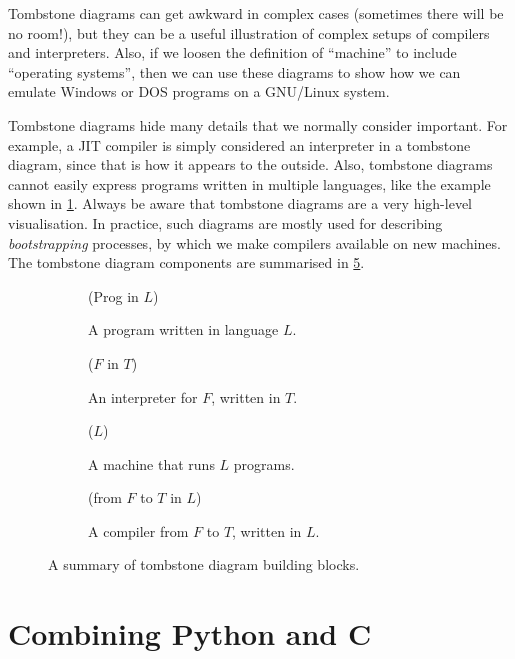 Tombstone diagrams can get awkward in complex cases (sometimes there
will be no room!), but they can be a useful illustration of complex
setups of compilers and interpreters.  Also, if we loosen the
definition of ``machine'' to include ``operating systems'', then we
can use these diagrams to show how we can emulate Windows or DOS
programs on a GNU/Linux system.

Tombstone diagrams hide many details that we normally consider
important.  For example, a JIT compiler is simply considered an
interpreter in a tombstone diagram, since that is how it appears to
the outside.  Also, tombstone diagrams cannot easily express programs
written in multiple languages, like the example shown in
\cref{sec:python-calling-c}.  Always be aware that tombstone diagrams
are a very high-level visualisation.  In practice, such diagrams are
mostly used for describing \textit{bootstrapping} processes, by which
we make compilers available on new machines.  The tombstone diagram
components are summarised in \cref{fig:tombstone}.

\begin{figure}[b]
  \centering

  \begin{subfigure}[b]{0.45\textwidth}
    \centering
    \tprog(Prog in $L$)
    \caption{A program written in language
      $L$.}
    \label{fig:tprog}
  \end{subfigure}
  \hfill
  \begin{subfigure}[b]{0.45\textwidth}
    \centering
    \tinter($F$ in $T$)
    \caption{An interpreter for $F$, written in $T$.}
    \label{fig:tinter}
  \end{subfigure}

  \bigskip

  \begin{subfigure}[b]{0.45\textwidth}
    \centering
    \tmachine($L$)
    \caption{A machine that runs $L$ programs.}
    \label{fig:tmachine}
  \end{subfigure}
  \hfill
  \begin{subfigure}[b]{0.45\textwidth}
    \centering
    \tcompiler(from $F$ to $T$ in $L$)
    \caption{A compiler from $F$ to $T$, written in $L$.}
    \label{fig:tcompiler}
  \end{subfigure}

  \caption{A summary of tombstone diagram building blocks.}
  \label{fig:tombstone}
\end{figure}

\section{Combining Python and C}
\label{sec:python-calling-c}

